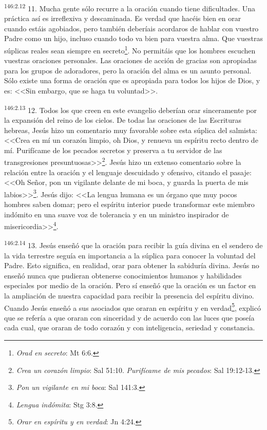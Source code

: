 \par 
\textsuperscript{146:2.12} 11. Mucha gente sólo recurre a la oración cuando tiene dificultades. Una práctica así es irreflexiva y descaminada. Es verdad que hacéis bien en orar cuando estáis agobiados, pero también deberíais acordaros de hablar con vuestro Padre como un hijo, incluso cuando todo va bien para vuestra alma. Que vuestras súplicas reales sean siempre en secreto\footnote{\textit{Orad en secreto}: Mt 6:6.}. No permitáis que los hombres escuchen vuestras oraciones personales. Las oraciones de acción de gracias son apropiadas para los grupos de adoradores, pero la oración del alma es un asunto personal. Sólo existe una forma de oración que es apropiada para todos los hijos de Dios, y es: <<Sin embargo, que se haga tu voluntad>>.

\par 
\textsuperscript{146:2.13} 12. Todos los que creen en este evangelio deberían orar sinceramente por la expansión del reino de los cielos. De todas las oraciones de las Escrituras hebreas, Jesús hizo un comentario muy favorable sobre esta súplica del salmista: <<Crea en mí un corazón limpio, oh Dios, y renueva un espíritu recto dentro de mí. Purifícame de los pecados secretos y preserva a tu servidor de las transgresiones presuntuosas>>\footnote{\textit{Crea un corazón limpio}: Sal 51:10. \textit{Purifícame de mis pecados}: Sal 19:12-13.}. Jesús hizo un extenso comentario sobre la relación entre la oración y el lenguaje descuidado y ofensivo, citando el pasaje: <<Oh Señor, pon un vigilante delante de mi boca, y guarda la puerta de mis labios>>\footnote{\textit{Pon un vigilante en mi boca}: Sal 141:3.}. Jesús dijo: <<La lengua humana es un órgano que muy pocos hombres saben domar; pero el espíritu interior puede transformar este miembro indómito en una suave voz de tolerancia y en un ministro inspirador de misericordia>>\footnote{\textit{Lengua indómita}: Stg 3:8.}.

\par 
\textsuperscript{146:2.14} 13. Jesús enseñó que la oración para recibir la guía divina en el sendero de la vida terrestre seguía en importancia a la súplica para conocer la voluntad del Padre. Esto significa, en realidad, orar para obtener la sabiduría divina. Jesús no enseñó nunca que pudieran obtenerse conocimientos humanos y habilidades especiales por medio de la oración. Pero sí enseñó que la oración es un factor en la ampliación de nuestra capacidad para recibir la presencia del espíritu divino. Cuando Jesús enseñó a sus asociados que oraran en espíritu y en verdad\footnote{\textit{Orar en espíritu y en verdad}: Jn 4:24.}, explicó que se refería a que oraran con sinceridad y de acuerdo con las luces que poseía cada cual, que oraran de todo corazón y con inteligencia, seriedad y constancia.

